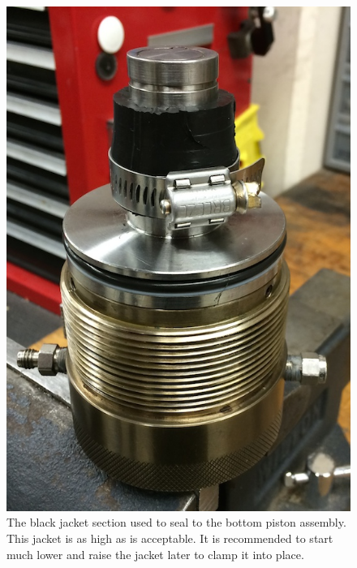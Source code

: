 \begin{figure}
	\centering
        \includegraphics[scale=0.7]{appendix_sample_prep/piston_seal.jpg}
   	\caption{The black jacket section used to seal to the bottom piston assembly.  This jacket is as high as is acceptable.  It is recommended to start much lower and raise the jacket later to clamp it into place.}
  	\label{piston_seal}
\end{figure}

